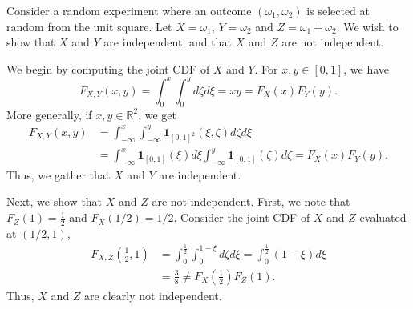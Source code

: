 \begin{example}
Consider a random experiment where an outcome $(\omega_1, \omega_2)$ is selected at random from the unit square.
Let $X = \omega_1$, $Y = \omega_2$ and $Z = \omega_1 + \omega_2$.
We wish to show that $X$ and $Y$ are independent, and that $X$ and $Z$ are not independent.

We begin by computing the joint CDF of $X$ and $Y$.
For $x,y \in [0,1]$, we have
\begin{equation*}
F_{X,Y}(x,y) = \int_0^{x} \int_0^{y} d\zeta d\xi
= x y = F_X(x) F_Y(y) .
\end{equation*}
More generally, if $x, y \in \mathbb{R}^2$, we get
\begin{equation*}
\begin{split}
F_{X,Y}(x,y)
&= \int_{-\infty}^{x} \int_{-\infty}^{y}
\mathbf{1}_{[0,1]^2} (\xi, \zeta) d\zeta d\xi \\
&= \int_{-\infty}^{x} \mathbf{1}_{[0,1]} (\xi) d \xi
\int_{-\infty}^{y} \mathbf{1}_{[0,1]} (\zeta) d\zeta
= F_X(x) F_Y(y) .
\end{split}
\end{equation*}
Thus, we gather that $X$ and $Y$ are independent.

Next, we show that $X$ and $Z$ are not independent.
First, we note that $F_Z (1) = \frac{1}{2}$ and $F_X (1/2) = 1/2$.
Consider the joint CDF of $X$ and $Z$ evaluated at $(1/2, 1)$,
\begin{equation*}
\begin{split}
F_{X,Z} \left( \frac{1}{2} ,1 \right)
&= \int_{0}^{\frac{1}{2}} \int_{0}^{1-\xi} d\zeta d\xi
= \int_{0}^{\frac{1}{2}} (1 - \xi) d\xi \\
&= \frac{3}{8}
\neq F_X \left( \frac{1}{2} \right) F_Z(1) .
\end{split}
\end{equation*}
Thus, $X$ and $Z$ are clearly not independent.
\end{example}


